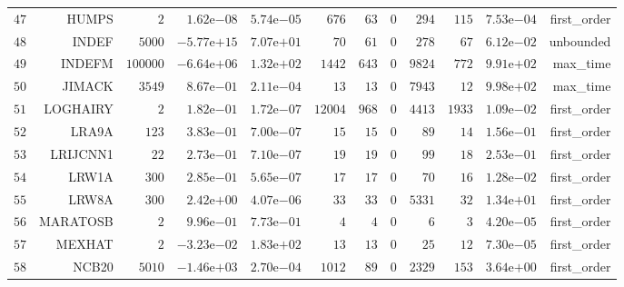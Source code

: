 \begin{longtable}{rrrrrrrrrrrr}
  \(    47\) & HUMPS & \(     2\) & \( 1.62\)e\(-08\) & \( 5.74\)e\(-05\) & \(   676\) & \(    63\) & \(     0\) & \(   294\) & \(   115\) & \( 7.53\)e\(-04\) & first\_order \\
  \(    48\) & INDEF & \(  5000\) & \(-5.77\)e\(+15\) & \( 7.07\)e\(+01\) & \(    70\) & \(    61\) & \(     0\) & \(   278\) & \(    67\) & \( 6.12\)e\(-02\) & unbounded \\
  \(    49\) & INDEFM & \(100000\) & \(-6.64\)e\(+06\) & \( 1.32\)e\(+02\) & \(  1442\) & \(   643\) & \(     0\) & \(  9824\) & \(   772\) & \( 9.91\)e\(+02\) & max\_time \\
  \(    50\) & JIMACK & \(  3549\) & \( 8.67\)e\(-01\) & \( 2.11\)e\(-04\) & \(    13\) & \(    13\) & \(     0\) & \(  7943\) & \(    12\) & \( 9.98\)e\(+02\) & max\_time \\
  \(    51\) & LOGHAIRY & \(     2\) & \( 1.82\)e\(-01\) & \( 1.72\)e\(-07\) & \( 12004\) & \(   968\) & \(     0\) & \(  4413\) & \(  1933\) & \( 1.09\)e\(-02\) & first\_order \\
  \(    52\) & LRA9A & \(   123\) & \( 3.83\)e\(-01\) & \( 7.00\)e\(-07\) & \(    15\) & \(    15\) & \(     0\) & \(    89\) & \(    14\) & \( 1.56\)e\(-01\) & first\_order \\
  \(    53\) & LRIJCNN1 & \(    22\) & \( 2.73\)e\(-01\) & \( 7.10\)e\(-07\) & \(    19\) & \(    19\) & \(     0\) & \(    99\) & \(    18\) & \( 2.53\)e\(-01\) & first\_order \\
  \(    54\) & LRW1A & \(   300\) & \( 2.85\)e\(-01\) & \( 5.65\)e\(-07\) & \(    17\) & \(    17\) & \(     0\) & \(    70\) & \(    16\) & \( 1.28\)e\(-02\) & first\_order \\
  \(    55\) & LRW8A & \(   300\) & \( 2.42\)e\(+00\) & \( 4.07\)e\(-06\) & \(    33\) & \(    33\) & \(     0\) & \(  5331\) & \(    32\) & \( 1.34\)e\(+01\) & first\_order \\
  \(    56\) & MARATOSB & \(     2\) & \( 9.96\)e\(-01\) & \( 7.73\)e\(-01\) & \(     4\) & \(     4\) & \(     0\) & \(     6\) & \(     3\) & \( 4.20\)e\(-05\) & first\_order \\
  \(    57\) & MEXHAT & \(     2\) & \(-3.23\)e\(-02\) & \( 1.83\)e\(+02\) & \(    13\) & \(    13\) & \(     0\) & \(    25\) & \(    12\) & \( 7.30\)e\(-05\) & first\_order \\
  \(    58\) & NCB20 & \(  5010\) & \(-1.46\)e\(+03\) & \( 2.70\)e\(-04\) & \(  1012\) & \(    89\) & \(     0\) & \(  2329\) & \(   153\) & \( 3.64\)e\(+00\) & first\_order \\

\end{longtable}
